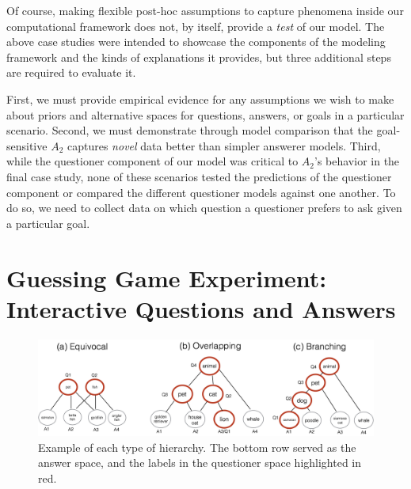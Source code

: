 \documentclass[12pt, floatsintext, jou]{apa6}
\begin{document}
Of course, making flexible post-hoc assumptions to capture phenomena inside our computational framework does not, by itself, provide a \emph{test} of our model. The above case studies were intended to showcase the components of the modeling framework and the kinds of explanations it provides, but three additional steps are required to evaluate it. 

First, we must provide empirical evidence for any assumptions we wish to make about priors and alternative spaces for questions, answers, or goals in a particular scenario. 
Second, we must demonstrate through model comparison that the goal-sensitive $A_2$ captures \emph{novel} data better than simpler answerer models. 
Third, while the questioner component of our model was critical to $A_2$'s behavior in the final case study, none of these scenarios tested the predictions of the questioner component or compared the different questioner models against one another. To do so, we need to collect data on which question a questioner prefers to ask given a particular goal. 

\section{Guessing Game Experiment: \\Interactive Questions and Answers}

\begin{figure}[t!]
\begin{center}
\includegraphics[scale = .3]{hierarchyStructureExamples.png}
\end{center}
\caption{Example of each type of hierarchy. The bottom row served as the answer space, and the labels in the questioner space highlighted in red.}
\label{fig:hierarchyStructures}
\end{figure}
\end{document}

